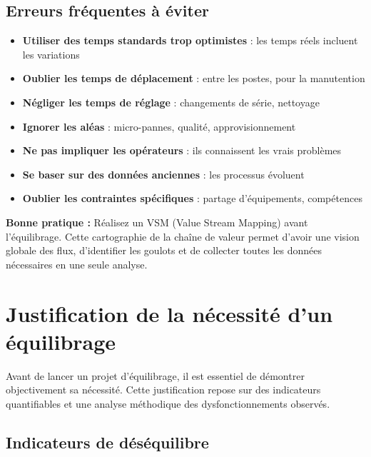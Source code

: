 \documentclass[12pt,a4paper]{article}
\newenvironment{methodbox}[1]
  {\begin{tcolorbox}[colback=blue!5!white, colframe=methodcolor, title=#1]\small}
  {\end{tcolorbox}}
\newenvironment{conseil}
  {\begin{tcolorbox}[colback=green!5!white, colframe=green!50!black, title=\textbf{Conseil}]\small}
  {\end{tcolorbox}}
\begin{document}
\subsection{Erreurs fréquentes à éviter}

\begin{methodbox}{Pièges à éviter lors de la collecte des données}
\begin{itemize}
    \item \textbf{Utiliser des temps standards trop optimistes} : les temps réels incluent les variations
    \item \textbf{Oublier les temps de déplacement} : entre les postes, pour la manutention
    \item \textbf{Négliger les temps de réglage} : changements de série, nettoyage
    \item \textbf{Ignorer les aléas} : micro-pannes, qualité, approvisionnement
    \item \textbf{Ne pas impliquer les opérateurs} : ils connaissent les vrais problèmes
    \item \textbf{Se baser sur des données anciennes} : les processus évoluent
    \item \textbf{Oublier les contraintes spécifiques} : partage d'équipements, compétences
\end{itemize}
\end{methodbox}

\begin{conseil}
\noindent\textbf{Bonne pratique :} Réalisez un VSM (Value Stream Mapping) avant l'équilibrage. Cette cartographie de la chaîne de valeur permet d'avoir une vision globale des flux, d'identifier les goulots et de collecter toutes les données nécessaires en une seule analyse.
\end{conseil}
\newpage

\section{Justification de la nécessité d'un équilibrage}

Avant de lancer un projet d'équilibrage, il est essentiel de démontrer objectivement sa nécessité. Cette justification repose sur des indicateurs quantifiables et une analyse méthodique des dysfonctionnements observés.

\subsection{Indicateurs de déséquilibre}
\end{document}
